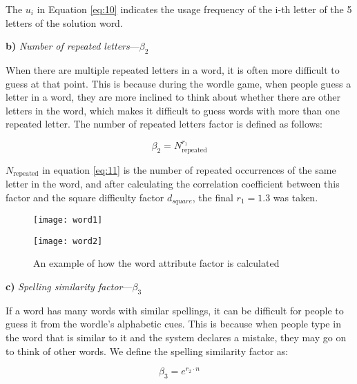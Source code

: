 \documentclass[12pt]{mcmthesis}
\begin{document}
The $ u_{i} $ in Equation \ref{eq:10} indicates the usage frequency of the i-th letter of the 5 letters of the solution word.

\textbf{b)} \textit{Number of repeated letters}---$ \beta_{2} $

When there are multiple repeated letters in a word, it is often more difficult to guess at that point. This is because during the wordle game, when people guess a letter in a word, they are more inclined to think about whether there are other letters in the word, which makes it difficult to guess words with more than one repeated letter. The number of repeated letters factor is defined as follows:

\begin{equation}\label{eq:11}
\beta _2=N_{\text{repeated}}^{r_{1}}
\end{equation}

$ N_{\text{repeated}} $ in equation \ref{eq:11} is the number of repeated occurrences of the same letter in the word, and after calculating the correlation coefficient between this factor and the square difficulty factor $ d_{square} $, the final $ r_{1}=1.3 $ was taken.
\begin{figure}[h]
	\centering
	\begin{minipage}[c]{0.45\textwidth}
		\centering
		\texttt{[image: word1]}
		\label{fig9_1}
	\end{minipage}
	\begin{minipage}[c]{0.5\textwidth}
		\centering
		\texttt{[image: word2]}
		\label{fig9_2}
	\end{minipage}
	\caption{An example of how the word attribute factor is calculated}
	\label{fig:9}
\end{figure}

\textbf{c)} \textit{Spelling similarity factor}---$ \beta_{3} $

If a word has many words with similar spellings, it can be difficult for people to guess it from the wordle's alphabetic cues. This is because when people type in the word that is similar to it and the system declares a mistake, they may go on to think of other words. We define the spelling similarity factor as:

\begin{equation}\label{eq:12}
\beta _3=e^{r_2\cdot n}
\end{equation}
\end{document}
